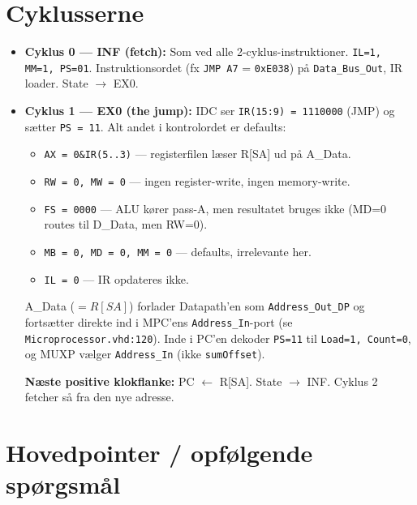 \documentclass[11pt,a4paper]{article}
\begin{document}
\section*{Cyklusserne}

\begin{itemize}
  \item \textbf{Cyklus 0 --- \textsc{INF} (fetch):}
        Som ved alle 2-cyklus-instruktioner. \texttt{IL=1, MM=1, PS=01}.
        Instruktionsordet (fx \texttt{JMP A7} = \texttt{0xE038}) på \texttt{Data\_Bus\_Out}, IR loader.
        State $\rightarrow$ \textsc{EX0}.

  \item \textbf{Cyklus 1 --- \textsc{EX0} (the jump):}
        IDC ser \texttt{IR(15:9) = 1110000} (JMP) og sætter \texttt{PS = 11}.
        Alt andet i kontrolordet er defaults:

        \begin{itemize}
          \item \texttt{AX = 0\&IR(5..3)} --- registerfilen læser R[SA] ud på A\_Data.
          \item \texttt{RW = 0, MW = 0} --- ingen register-write, ingen memory-write.
          \item \texttt{FS = 0000} --- ALU kører pass-A, men resultatet bruges ikke (MD=0 routes til D\_Data, men RW=0).
          \item \texttt{MB = 0, MD = 0, MM = 0} --- defaults, irrelevante her.
          \item \texttt{IL = 0} --- IR opdateres ikke.
        \end{itemize}

        A\_Data ($= R[SA]$) forlader Datapath'en som \texttt{Address\_Out\_DP} og fortsætter direkte ind
        i MPC'ens \texttt{Address\_In}-port (se \texttt{Microprocessor.vhd:120}).
        Inde i PC'en dekoder \texttt{PS=11} til \texttt{Load=1, Count=0}, og MUXP vælger
        \texttt{Address\_In} (ikke \texttt{sumOffset}).

        \textbf{Næste positive klokflanke:} PC $\leftarrow$ R[SA]. State $\rightarrow$ \textsc{INF}.
        Cyklus 2 fetcher så fra den nye adresse.
\end{itemize}

\section*{Hovedpointer / opfølgende spørgsmål}
\end{document}
